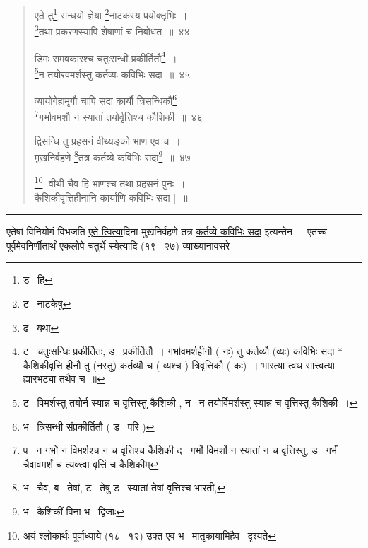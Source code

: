 \documentclass[11pt, openany]{book}
\begin{document}
\begin{quote}
{\na एते तु\renewcommand{\thefootnote}{1}\footnote{ड \textendash\ हि} सन्धयो ज्ञेया \renewcommand{\thefootnote}{2}\footnote{ट \textendash\ नाटकेषु}नाटकस्य प्रयोक्तृभिः~।\\
\renewcommand{\thefootnote}{3}\footnote{ढ \textendash\ यथा}तथा प्रकरणस्यापि शेषाणां च निबोधत~॥~४४

डिमः समवकारश्च चतुःसन्धी प्रकीर्तितौ\renewcommand{\thefootnote}{4}\footnote{ट \textendash\ चतुःसन्धिः प्रकीर्तितः, ड \textendash\ प्रकीर्तितौ~। गर्भावमर्शहीनौ ( नः) तु कर्तव्यौ (व्यः) कविभिः सदा *~। कैशिकीवृत्ति हीनौ तु (नस्तु) कर्तव्यौ च ( व्यश्च ) त्रिवृत्तिकौ ( कः)~। भारत्या त्वथ सात्त्वत्या ह्यारभट्या तथैव च~॥}~।\\
\renewcommand{\thefootnote}{5}\footnote{ट \textendash\ विमर्शस्तु तयोर्न स्यान्न च वृत्तिस्तु कैशिकी , न \textendash\ न तयोर्विमर्शस्तु स्यान्न च वृत्तिस्तु कैशिकी~।}न तयोरवमर्शस्तु कर्तव्यः कविभिः सदा~॥~४५

व्यायोगेहामृगौ चापि सदा कार्यौ त्रिसन्धिकौ\renewcommand{\thefootnote}{6}\footnote{भ \textendash\ त्रिसन्धी संप्रकीर्तितौ ( ड \textendash\ परि )}~।\\
\renewcommand{\thefootnote}{7}\footnote{प \textendash\ न गर्भो न विमर्शश्च न च वृत्तिश्च कैशिकी द \textendash\ गर्भो विमर्शो न स्यातां न च वृत्तिस्तु, ड \textendash\ गर्भं चैवावमर्शं च त्यक्त्वा वृत्तिं च कैशिकीम्}गर्भावमर्शौ न स्यातां तयोर्वृत्तिश्च कौशिकी~॥~४६

द्विसन्धि तु प्रहसनं वीथ्यङ्को भाण एव च~।\\
मुखनिर्वहणे \renewcommand{\thefootnote}{8}\footnote{भ \textendash\ चैव, ब \textendash\ तेषां, ट \textendash\ तेषु ड \textendash\ स्यातां तेषां वृत्तिश्च भारती,}तत्र कर्तव्ये कविभिः सदा\renewcommand{\thefootnote}{9}\footnote{भ \textendash\ कैशिकीं विना भ \textendash\ द्विजाः}~॥~४७

\renewcommand{\thefootnote}{10}\footnote{अयं श्लोकार्थः पूर्वाध्याये (१८ \textendash\ १२) उक्त एव भ \textendash\ मातृकायामिहैव \textendash\ दृश्यते}[ वीथी चैव हि भाणश्च तथा प्रहसनं पुनः~।\\
कैशिकीवृत्तिहीनानि कार्याणि कविभिः सदा ]~॥}
\end{quote}

\hrule

\vspace{2mm}
एतेषां विनियोगं विभजति \underline{एते त्वित्या}दिना {\qt मुखनिर्वहणे तत्र \underline{कर्तव्ये कविभिः सदा}} इत्यन्तेन~। एतच्च पूर्वमेवनिर्णीतार्थं {\qt एकलोपे चतुर्थे} स्येत्यादि (१९ \textendash\ २७) व्याख्यानावसरे~।\\
\end{document}
